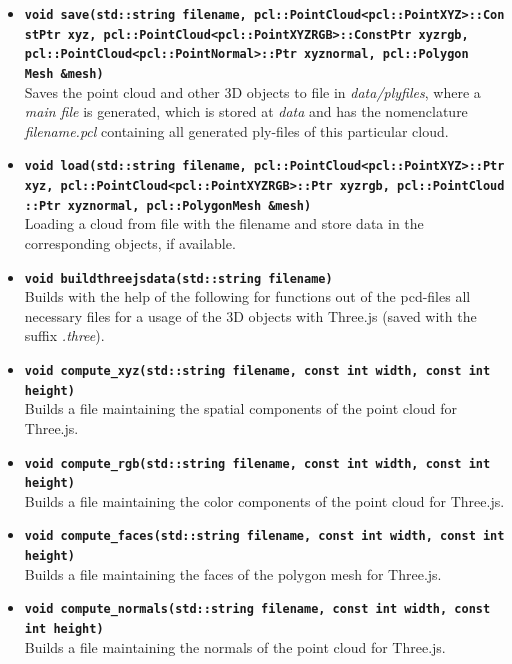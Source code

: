 \documentclass[paper=a4,11pt,bibliography=totoc]{scrartcl}
\begin{document}
\begin{itemize}
\item \textbf{\texttt{void save(std::string filename, pcl::PointCloud<pcl::PointXYZ>::Con\\stPtr xyz, pcl::PointCloud<pcl::PointXYZRGB>::ConstPtr xyzrgb,\\pcl::PointCloud<pcl::PointNormal>::Ptr xyznormal, pcl::Polygon\\Mesh \&mesh)}}\\
\textsf{Saves the point cloud and other 3D objects to file in \textit{data/plyfiles}, where a \textit{main file} is generated, which is stored at \textit{data} and has the nomenclature \textit{filename.pcl} containing all generated ply-files of this particular cloud.}
\item \textbf{\texttt{void load(std::string filename, pcl::PointCloud<pcl::PointXYZ>::Ptr\\xyz, pcl::PointCloud<pcl::PointXYZRGB>::Ptr xyzrgb, pcl::PointCloud\\<pcl::PointNormal>::Ptr xyznormal, pcl::PolygonMesh \&mesh)}}\\\textsf{Loading a cloud from file with the filename and store data in the corresponding objects, if available.}
\item \textbf{\texttt{void buildthreejsdata(std::string filename)}}\\
\textsf{Builds with the help of the following for functions out of the pcd-files all necessary files for a usage of the 3D objects with Three.js (saved with the suffix \textit{.three}).}
\item \textbf{\texttt{void compute\_xyz(std::string filename, const int width, const int\\height) }}\\
\textsf{Builds a file maintaining the spatial components of the point cloud for Three.js.}
\item \textbf{\texttt{void compute\_rgb(std::string filename, const int width, const int\\height)}}\\
\textsf{Builds a file maintaining the color components of the point cloud for Three.js.}
\item \textbf{\texttt{void compute\_faces(std::string filename, const int width, const int\\height)}}\\
\textsf{Builds a file maintaining the faces of the polygon mesh for Three.js.}
\item \textbf{\texttt{void compute\_normals(std::string filename, const int width, const\\int height)}}\\
\textsf{Builds a file maintaining the normals of the point cloud for Three.js.}
\end{itemize}
%
\end{document}
